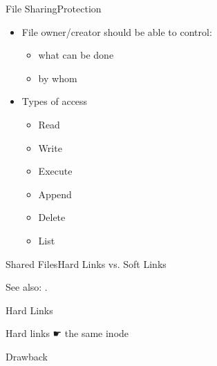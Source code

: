 \begin{frame}{File Sharing}{Protection}
  \begin{itemize}
  \item File owner/creator should be able to control:
    \begin{itemize}
    \item what can be done
    \item by whom
    \end{itemize}
  \item Types of access
    \begin{itemize}
    \item Read
    \item Write
    \item Execute
    \item Append
    \item Delete
    \item List
    \end{itemize}
  \end{itemize}
\end{frame}

\begin{frame}{Shared Files}{Hard Links vs. Soft Links}
  \centering
  \mode<beamer>{ \texttt{[image: mos-figs-6-18]} }%
\end{frame}

See also: .

\begin{frame}{Hard Links}
  \begin{iblock}{Hard links {☛} the same inode}
    \begin{center}
    \end{center}
  \end{iblock}
\end{frame}

\begin{frame}
  \begin{iblock}{Drawback}
    \begin{center}
    \end{center}
  \end{iblock}
\end{frame}

